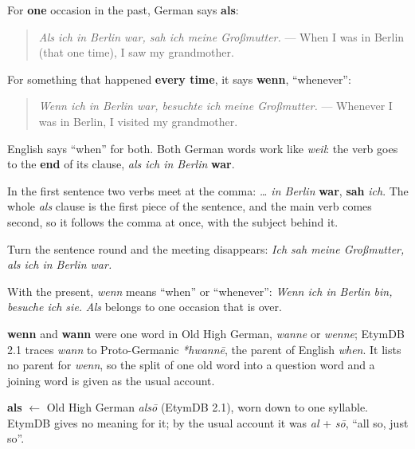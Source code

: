\begin{grammarlens}[title={Grammar Lens: one occasion, or every occasion}]
For \textbf{one} occasion in the past, German says \textbf{als}:

\begin{quote}
\emph{Als ich in Berlin war, sah ich meine Großmutter.} — When I was in Berlin (that one time), I saw my grandmother.
\end{quote}

For something that happened \textbf{every time}, it says \textbf{wenn}, \textquotedblleft{}whenever\textquotedblright{}:

\begin{quote}
\emph{Wenn ich in Berlin war, besuchte ich meine Großmutter.} — Whenever I was in Berlin, I visited my grandmother.
\end{quote}

English says \textquotedblleft{}when\textquotedblright{} for both. Both German words work like \emph{weil}: the verb goes to the \textbf{end} of its clause, \emph{als ich in Berlin} \textbf{war}.
\end{grammarlens}

\begin{culture}
In the first sentence two verbs meet at the comma: \emph{… in Berlin} \textbf{war}, \textbf{sah} \emph{ich}. The whole \emph{als} clause is the first piece of the sentence, and the main verb comes second, so it follows the comma at once, with the subject behind it.

Turn the sentence round and the meeting disappears: \emph{Ich sah meine Großmutter, als ich in Berlin war.}

With the present, \emph{wenn} means \textquotedblleft{}when\textquotedblright{} or \textquotedblleft{}whenever\textquotedblright{}: \emph{Wenn ich in Berlin bin, besuche ich sie.} \emph{Als} belongs to one occasion that is over.
\end{culture}

\begin{cousinweb}
\textbf{wenn} and \textbf{wann} were one word in Old High German, \emph{wanne} or \emph{wenne}; EtymDB 2.1 traces \emph{wann} to Proto-Germanic \emph{*hwannē}, the parent of English \emph{when}. It lists no parent for \emph{wenn}, so the split of one old word into a question word and a joining word is given as the usual account.

\textbf{als} $\leftarrow$ Old High German \emph{alsō} (EtymDB 2.1), worn down to one syllable. EtymDB gives no meaning for it; by the usual account it was \emph{al} + \emph{sō}, \textquotedblleft{}all so, just so\textquotedblright{}.
\end{cousinweb}

